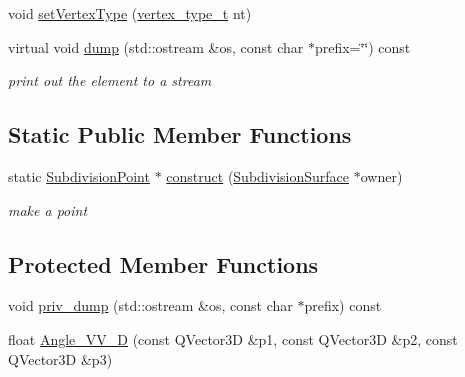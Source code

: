\begin{DoxyCompactItemize}
\item 
void \hyperlink{classShipCAD_1_1SubdivisionPoint_a614259dfa2470bbbd7b8cc73039ad501}{set\-Vertex\-Type} (\hyperlink{namespaceShipCAD_a03171cc921c53a568b778f5131a60deb}{vertex\-\_\-type\-\_\-t} nt)
\item 
virtual void \hyperlink{classShipCAD_1_1SubdivisionPoint_aed72cf5e8dc67e980010d195f3a376a3}{dump} (std\-::ostream \&os, const char $\ast$prefix=\char`\"{}\char`\"{}) const 
\begin{DoxyCompactList}\small\item\em print out the element to a stream \end{DoxyCompactList}\end{DoxyCompactItemize}
\subsection*{Static Public Member Functions}
\begin{DoxyCompactItemize}
\item 
static \hyperlink{classShipCAD_1_1SubdivisionPoint}{Subdivision\-Point} $\ast$ \hyperlink{classShipCAD_1_1SubdivisionPoint_a8e907cca747b0483374d4fdde8eb4ad1}{construct} (\hyperlink{classShipCAD_1_1SubdivisionSurface}{Subdivision\-Surface} $\ast$owner)
\begin{DoxyCompactList}\small\item\em make a point \end{DoxyCompactList}\end{DoxyCompactItemize}
\subsection*{Protected Member Functions}
\begin{DoxyCompactItemize}
\item 
void \hyperlink{classShipCAD_1_1SubdivisionPoint_aa2d85a086268f335eefeaef0b48a96a1}{priv\-\_\-dump} (std\-::ostream \&os, const char $\ast$prefix) const 
\item 
float \hyperlink{classShipCAD_1_1SubdivisionPoint_a72061d495903d8265f33bada30a0c416}{Angle\-\_\-\-V\-V\-\_\-D} (const Q\-Vector3\-D \&p1, const Q\-Vector3\-D \&p2, const Q\-Vector3\-D \&p3)
\end{DoxyCompactItemize}
